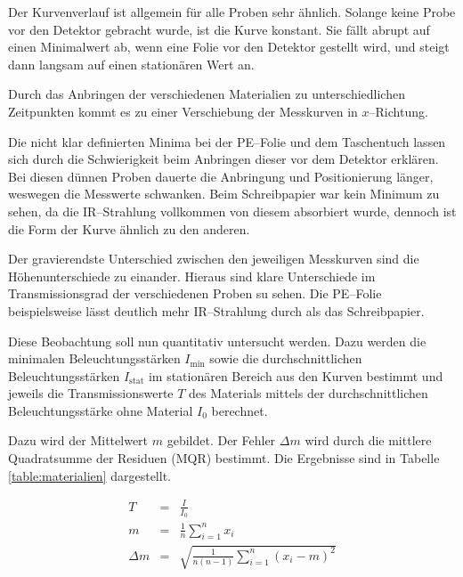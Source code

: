 \documentclass[12pt,a4paper]{scrartcl}
\numberwithin{equation}{section} %
\begin{document}
Der Kurvenverlauf ist allgemein für alle Proben sehr ähnlich. Solange keine Probe vor den Detektor gebracht wurde, ist die Kurve konstant. Sie fällt abrupt auf einen Minimalwert ab, wenn eine Folie vor den Detektor gestellt wird, und steigt dann langsam auf einen stationären Wert an.

Durch das Anbringen der verschiedenen Materialien zu unterschiedlichen Zeitpunkten kommt es zu einer Verschiebung der Messkurven in $x$--Richtung.

Die nicht klar definierten Minima bei der PE--Folie und dem Taschentuch lassen sich durch die Schwierigkeit beim Anbringen dieser vor dem Detektor erklären. Bei diesen dünnen Proben dauerte die Anbringung und Positionierung länger, weswegen die Messwerte schwanken. Beim Schreibpapier war kein Minimum zu sehen, da die IR--Strahlung vollkommen von diesem absorbiert wurde, dennoch ist die Form der Kurve ähnlich zu den anderen.

Der gravierendste Unterschied zwischen den jeweiligen Messkurven sind die Höhenunterschiede zu einander. Hieraus sind klare Unterschiede im Transmissionsgrad der verschiedenen Proben su sehen. Die PE--Folie beispielsweise lässt deutlich mehr IR--Strahlung durch als das Schreibpapier.

Diese Beobachtung soll nun quantitativ untersucht werden. Dazu werden die minimalen Beleuchtungsstärken $I_\mathrm{min}$ sowie die durchschnittlichen Beleuchtungsstärken $I_\mathrm{stat}$ im stationären Bereich aus den Kurven bestimmt und jeweils die Transmissionswerte $T$ des Materials mittels der durchschnittlichen Beleuchtungsstärke ohne Material $I_0$ berechnet.

Dazu wird der Mittelwert $m$ gebildet. Der Fehler $\Delta m$ wird durch die mittlere Quadratsumme der Residuen (MQR) bestimmt. Die Ergebnisse sind in Tabelle \ref{table:materialien} dargestellt.

\begin{eqnarray}
	T &=& \frac{I}{I_0} \\
	m &=& \frac{1}{n} \sum_{i=1}^{n} x_i \\
	\Delta m &=& \sqrt{\frac{1}{n (n-1)} \sum_{i=1}^{n} (x_i - m)^2}
\end{eqnarray}
\end{document}
